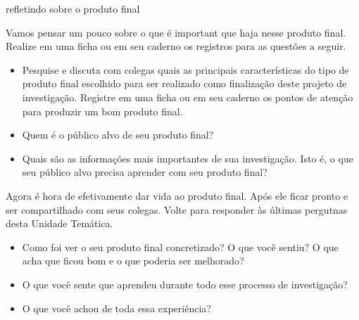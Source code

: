 \begin{task}{refletindo sobre o produto final}

Vamos pensar um pouco sobre o que é important que haja nesse produto final. Realize em uma ficha ou em seu caderno os registros para as questões a seguir.

\begin{itemize}
\item Pesquise e discuta com colegas quais as principais características do tipo de produto final escolhido para ser realizado como finalização deste projeto de investigação. Registre em uma ficha ou em seu caderno os pontos de atenção para produzir um bom produto final.
\item Quem é o público alvo de seu produto final?
\item Quais são as informações mais importantes de sua investigação. Isto é, o que seu público alvo precisa aprender com seu produto final?
\end{itemize}

Agora é hora de efetivamente dar vida ao produto final. Após ele ficar pronto e ser compartilhado com seus colegas. Volte para responder às últimas pergutnas desta Unidade Temática.

\begin{itemize}
\item Como foi ver o seu produto final concretizado? O que você sentiu? O que acha que ficou bom e o que poderia ser melhorado?
\item O que você sente que aprendeu durante todo esse processo de investigação?
\item O que você achou de toda essa experiência?
\end{itemize}

\end{task}